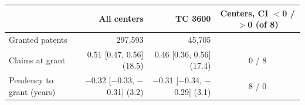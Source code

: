 \begin{tabular}{lrrc}
\toprule
 & All centers & TC 3600 & Centers, CI $<$0 / $>$0 (of 8) \\
\midrule
Granted patents & 297,593 & 45,705 &  \\
Claims at grant & 0.51 [0.47, 0.56] (18.5) & 0.46 [0.36, 0.56] (17.4) & 0 / 8 \\
Pendency to grant (years) & $-$0.32 [$-$0.33, $-$0.31] (3.2) & $-$0.31 [$-$0.34, $-$0.29] (3.1) & 8 / 0 \\
\bottomrule
\end{tabular}
